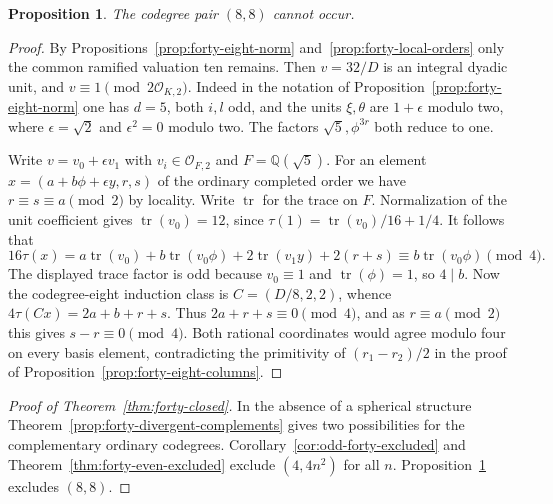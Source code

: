 \documentclass[11pt,reqno]{amsart}
\newtheorem{proposition}[theorem]{Proposition}
\theoremstyle{remark}\newtheorem{remark}[theorem]{Remark}
\numberwithin{equation}{section}
\begin{document}
\begin{proposition}\label{prop:forty-ten}
The codegree pair $(8,8)$ cannot occur.
\end{proposition}
\begin{proof}
By Propositions~\ref{prop:forty-eight-norm} and~\ref{prop:forty-local-orders}
only the common ramified valuation ten remains. Then $v=32/D$ is an
integral dyadic unit, and $v\equiv1\pmod{2\mathcal O_{K,2}}$.
Indeed in the notation of Proposition~\ref{prop:forty-eight-norm} one has
$d=5$, both $i,l$ odd, and the units $\xi,\theta$ are $1+\epsilon$
modulo two, where $\epsilon=\sqrt2$ and $\epsilon^2=0$ modulo two.
The factors $\sqrt5,\phi^{3r}$ both reduce to one.

Write $v=v_0+\epsilon v_1$ with $v_i\in\mathcal O_{F,2}$ and
$F=\mathbb Q(\sqrt5)$. For an element
$x=(a+b\phi+\epsilon y,r,s)$ of the ordinary completed order we have
$r\equiv s\equiv a\pmod2$ by locality. Write $\operatorname{tr}$
for the trace on $F$. Normalization of the unit coefficient gives
$\operatorname{tr}(v_0)=12$, since $\tau(1)=\operatorname{tr}(v_0)/16+1/4$.
It follows that
\[
 16\tau(x)=a\operatorname{tr}(v_0)
    +b\operatorname{tr}(v_0\phi)+2\operatorname{tr}(v_1y)+2(r+s)
    \equiv b\operatorname{tr}(v_0\phi)\pmod4.
\]
The displayed trace factor is odd because $v_0\equiv1$ and
$\operatorname{tr}(\phi)=1$, so $4\mid b$. Now the codegree-eight
induction class is $C=(D/8,2,2)$, whence
$4\tau(Cx)=2a+b+r+s$. Thus $2a+r+s\equiv0\pmod4$, and as
$r\equiv a\pmod2$ this gives $s-r\equiv0\pmod4$. Both rational
coordinates would agree modulo four on every basis element, contradicting
the primitivity of $(r_1-r_2)/2$ in the proof of
Proposition~\ref{prop:forty-eight-columns}.
\end{proof}

\begin{proof}[Proof of Theorem~\ref{thm:forty-closed}]
In the absence of a spherical structure Theorem~\ref{prop:forty-divergent-complements} gives two possibilities for the complementary ordinary codegrees. Corollary~\ref{cor:odd-forty-excluded} and Theorem~\ref{thm:forty-even-excluded} exclude $(4,4n^2)$ for all $n$. Proposition~\ref{prop:forty-ten} excludes $(8,8)$.
\end{proof}
\end{document}
